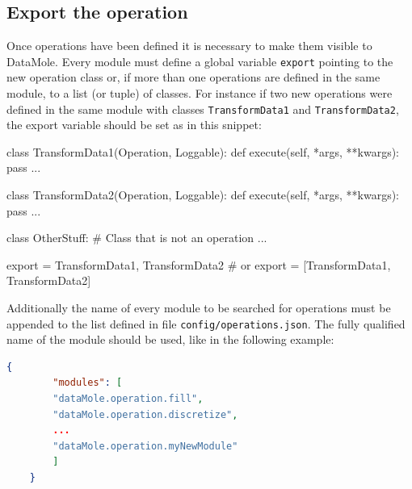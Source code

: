 \subsection{Export the operation}
Once operations have been defined it is necessary to make them visible to DataMole. Every module must define a global variable \texttt{export} pointing to the new operation class or, if more than one operations are defined in the same module, to a list (or tuple) of classes. For instance if two new operations were defined in the same module with classes \texttt{TransformData1} and \texttt{TransformData2}, the export variable should be set as in this snippet:
\begin{python}
	class TransformData1(Operation, Loggable):
	def execute(self, *args, **kwargs):
	pass
	...
	
	class TransformData2(Operation, Loggable):
	def execute(self, *args, **kwargs):
	pass
	...
	
	class OtherStuff:
	# Class that is not an operation
	...
	
	export = TransformData1, TransformData2
	# or export = [TransformData1, TransformData2]
\end{python}
Additionally the name of every module to be searched for operations must be appended to the list defined in file \texttt{config/operations.json}. The fully qualified name of the module should be used, like in the following example:
\begin{lstlisting}[language=json,frame=none, emph={myNewModule}, emphstyle=\color{deepred}]
	{
		"modules": [
		"dataMole.operation.fill",
		"dataMole.operation.discretize",
		...
		"dataMole.operation.myNewModule"
		]
	}
\end{lstlisting}

